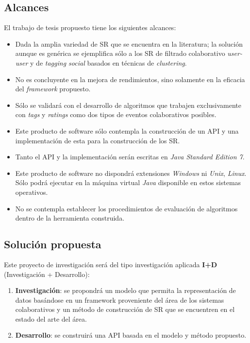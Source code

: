 \subsection{Alcances}

El trabajo de tesis propuesto tiene los siguientes alcances:
\begin{itemize}
	\item Dada la amplia variedad de SR que se encuentra en la literatura; la solución aunque es genérica se ejemplifica sólo a los SR de filtrado colaborativo \textit{user-user} y de \textit{tagging social} basados en técnicas de \textit{clustering}.
	\item No es concluyente en la mejora de rendimientos, sino solamente en la eficacia del \textit{framework} propuesto.
	\item Sólo se validará con el desarrollo de algoritmos que trabajen exclusivamente con \textit{tags} y \textit{ratings} como dos tipos de eventos colaborativos posibles.
	\item Este producto de software sólo contempla la construcción de un API y una implementación de esta para la construcción de los SR.
	\item Tanto el API y la implementación serán escritas en \textit{Java Standard Edition 7}.
	\item Este producto de software no dispondrá extensiones \textit{Windows} ni \textit{Unix}, \textit{Linux}. Sólo podrá ejecutar en la máquina virtual \textit{Java} disponible en estos sistemas operativos.
	\item No se contempla establecer los procedimientos de evaluación de algoritmos dentro de la herramienta construida.
\end{itemize}

\subsection{Soluci\'on propuesta}
\label{intro:solucionpropuesta}

Este proyecto de investigación será del tipo investigación aplicada \textbf{I+D} (Investigación
+ Desarrollo):
\begin{enumerate}
\item \textbf{Investigación}: se propondrá un modelo que permita la representación de datos basándose en un framework proveniente del área de los sistemas colaborativos y un método de construcción de SR que se encuentren en el estado del arte del área.
\item \textbf{Desarrollo}: se construirá una API basada en el modelo y método propuesto. 
\end{enumerate}

